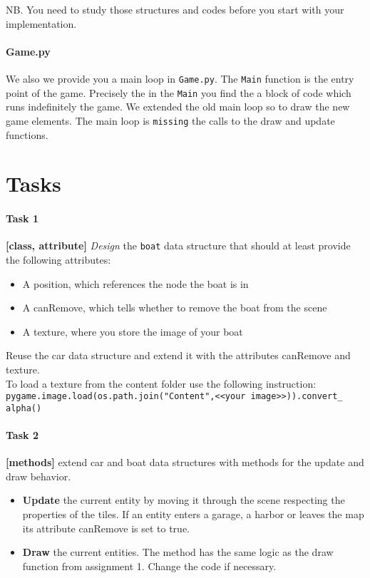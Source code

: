 \documentclass[10pt,a4paper]{article}
\begin{document}
\noindent
NB. You need to study those structures and codes before you start with your implementation. 
	
\paragraph{Game.py}


We also we provide you a main loop in \texttt{Game.py}. The \texttt{Main} function is the entry point of the game. Precisely the in the \texttt{Main} you find the a block of code which runs indefinitely the game. We extended the old main loop so to draw the new game elements. The main loop is \texttt{missing} the calls to the draw and update functions.


\section{Tasks}	

\paragraph{Task 1} \textbf{[class, attribute]} \textit{Design} the \texttt{boat} data structure that should at least provide the following attributes:
\begin{itemize}[noitemsep,nolistsep]
	\item A position, which references the node the boat is in
	\item A canRemove, which tells whether to remove the boat from the scene
	\item A texture, where you store the image of your boat
\end{itemize}
Reuse the car data structure and extend it with the attributes canRemove and  texture. \\To load a texture from the content folder use the following instruction: \\
\texttt{pygame.image.load(os.path.join("Content",<<your image>>)).convert\_ alpha()}

\paragraph{Task 2} \textbf{[methods]}  extend car and boat data structures with methods for the update and draw behavior.   
\begin{itemize}[noitemsep,nolistsep]
	\item \textbf{Update} the current entity by moving it through the scene respecting the properties of the tiles. If an entity enters a garage, a harbor or leaves the map its attribute canRemove is set to true. 
	\item \textbf{Draw} the current entities. The method has the same logic as the draw function from assignment 1. Change the code if necessary.  
\end{itemize}
\end{document}
